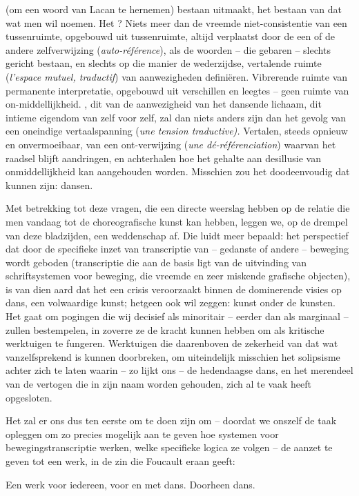 {(om een woord van Lacan te hernemen) bestaan uitmaakt, het bestaan van dat wat men  wil noemen. Het ? Niets meer dan de vreemde niet{}-consistentie van een tussenruimte, opgebouwd uit tussenruimte, altijd verplaatst door de een of de andere zelfverwijzing ({\em auto{}-r\'ef\'erence}), als de woorden {--} die gebaren {--} slechts gericht bestaan, en slechts op die manier de wederzijdse, vertalende ruimte ({\em l'espace mutuel, traductif}) van aanwezigheden defini\"eren. Vibrerende ruimte van permanente interpretatie, opgebouwd uit verschillen en leegtes {--} geen ruimte van on{}-middellijkheid. , dit  van de aanwezigheid van het dansende lichaam, dit intieme eigendom van zelf voor zelf, zal dan niets anders zijn dan het gevolg van een oneindige vertaalspanning ({\em une tension traductive).} Vertalen, steeds opnieuw en onvermoeibaar, van een ont{}-verwijzing ({\em une d\'e{}-r\'ef\'erenciation}) waarvan het raadsel blijft aandringen, en achterhalen hoe het gehalte aan desillusie van onmiddellijkheid kan aangehouden worden. Misschien zou het doodeenvoudig dat kunnen zijn: dansen.

Met betrekking tot deze vragen, die een directe weerslag hebben op de relatie die men vandaag tot de choreografische kunst kan hebben, leggen we, op de drempel van deze bladzijden, een weddenschap af. Die luidt meer bepaald: het perspectief dat door de specifieke inzet van transcriptie van {--} gedanste of andere {--} beweging wordt geboden (transcriptie die aan de basis ligt van de uitvinding van schriftsystemen voor beweging, die vreemde en zeer miskende grafische objecten), is van dien aard dat het een crisis veroorzaakt binnen de dominerende visies op dans, een volwaardige kunst; hetgeen ook wil zeggen: kunst onder de kunsten. Het gaat om pogingen die wij decisief als minoritair {--} eerder dan als marginaal {--} zullen bestempelen, in zoverre ze de kracht kunnen hebben om als kritische werktuigen te fungeren. Werktuigen die daarenboven de zekerheid van dat wat vanzelfsprekend is kunnen doorbreken, om uiteindelijk misschien het solipsisme achter zich te laten waarin {--} zo lijkt ons {--} de hedendaagse dans, en het merendeel van de vertogen die in zijn naam worden gehouden, zich al te vaak heeft opgesloten.

Het zal er ons dus ten eerste om te doen zijn om {--} doordat we onszelf de taak opleggen om zo precies mogelijk aan te geven hoe systemen voor bewegingstranscriptie werken, welke specifieke logica ze volgen {--} de aanzet te geven tot een werk, in de zin die Foucault eraan geeft: 


Een werk voor iedereen, voor en met dans. Doorheen dans.}
